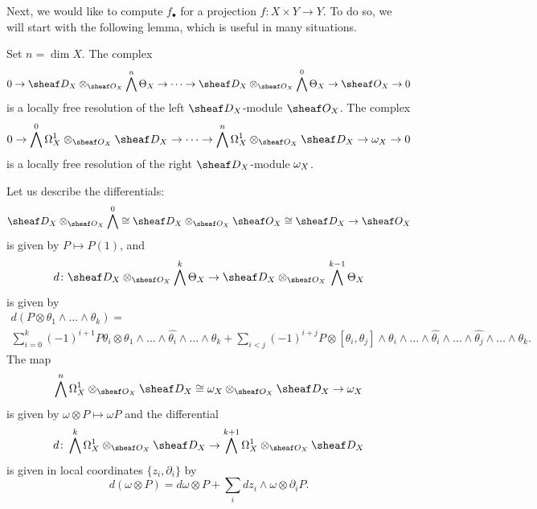 \documentclass[number-in-sections,a4paper]{notes}
\begin{document}
Next, we would like to compute $f_\bullet$ for a projection $f\colon X \times Y \to Y$.
To do so, we will start with the following lemma, which is useful in many situations.

\begin{Lemma}\label{lem:spencer_resolution}
    Set $n = \dim X$.
    The complex
    \[
        0 \to
        \sD_{X} \otimes_{\sO_X} \bigwedge^n \tb X \to
        \dots \to
        \sD_{X} \otimes_{\sO_X} \bigwedge^0 \tb X \to
        \sO_X \to 0
    \]
    is a locally free resolution of the left $\sD_X$-module $\sO_X$.
    The complex
    \[
        0 \to
        \bigwedge^0 \ctb X \otimes_{\sO_X} \sD_X \to
        \dots \to
        \bigwedge^n \ctb X \otimes_{\sO_X} \sD_X \to
        \canon_X \to 0
    \]
    is a locally free resolution of the right $\sD_X$-module $\omega_X$.
\end{Lemma}

Let us describe the differentials:
\[
    \sD_{X} \otimes_{\sO_X} \bigwedge^0 \cong
    \sD_{X} \otimes_{\sO_X} \sO_X \cong
    \sD_X
    \to
    \sO_X
\]
is given by $P \mapsto P(1)$, and
\[
    d\colon \sD_{X} \otimes_{\sO_X} \bigwedge^k \tb X \to
    \sD_{X} \otimes_{\sO_X} \bigwedge^{k-1} \tb X
\]
is given by
\begin{multline*}
    d(P \otimes \theta_1 \wedge \dots \wedge \theta_k) = \\
    \sum_{i=0}^k (-1)^{i+1} P\theta_i \otimes \theta_1 \wedge \dots \wedge \widehat{\theta_i} \wedge \dots \wedge \theta_k + \sum_{i < j} (-1)^{i+j} P \otimes [\theta_i,\theta_j] \wedge \theta_i \wedge \dots \wedge \widehat{\theta_i} \wedge \dots \wedge \widehat{\theta_j} \wedge \dots \wedge \theta_k.
\end{multline*}
The map
\[
    \bigwedge^n \ctb X \otimes_{\sO_X} \sD_X \cong
    \canon_X \otimes_{\sO_X} \sD_X \to
    \canon_X
\]
is given by $\omega \otimes P \mapsto \omega P$ and the differential
\[
    d\colon \bigwedge^k \ctb X \otimes_{\sO_X} \sD_X \to
    \bigwedge^{k+1} \ctb X \otimes_{\sO_X} \sD_X
\]
is given in local coordinates $\{z_i, \partial_i\}$ by
\[
    d(\omega \otimes P) = d\omega \otimes P + \sum_i dz_i \wedge \omega \otimes \partial_i P.
\]
\end{document}
